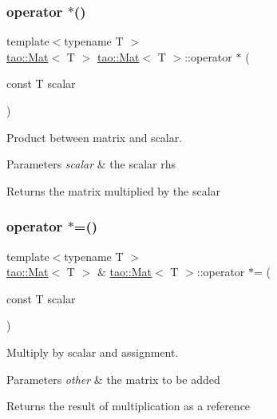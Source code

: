 \subsubsection{\texorpdfstring{operator $\ast$()}{operator *()}\hspace{0.1cm}{\footnotesize\ttfamily [2/2]}}
{\footnotesize\ttfamily template$<$typename T $>$ \\
\mbox{\hyperlink{classtao_1_1_mat}{tao\+::\+Mat}}$<$ T $>$ \mbox{\hyperlink{classtao_1_1_mat}{tao\+::\+Mat}}$<$ T $>$\+::operator $\ast$ (\begin{DoxyParamCaption}\item[{const T}]{scalar }\end{DoxyParamCaption})}



Product between matrix and scalar. 


\begin{DoxyParams}{Parameters}
{\em scalar} & the scalar rhs \\
\hline
\end{DoxyParams}
\begin{DoxyReturn}{Returns}
the matrix multiplied by the scalar 
\end{DoxyReturn}
\mbox{\label{classtao_1_1_mat_add01ca6b2275ad6d4fbde98056d73276}} 
\subsubsection{\texorpdfstring{operator $\ast$=()}{operator *=()}}
{\footnotesize\ttfamily template$<$typename T $>$ \\
\mbox{\hyperlink{classtao_1_1_mat}{tao\+::\+Mat}}$<$ T $>$ \& \mbox{\hyperlink{classtao_1_1_mat}{tao\+::\+Mat}}$<$ T $>$\+::operator $\ast$= (\begin{DoxyParamCaption}\item[{const T}]{scalar }\end{DoxyParamCaption})}



Multiply by scalar and assignment. 


\begin{DoxyParams}{Parameters}
{\em other} & the matrix to be added \\
\hline
\end{DoxyParams}
\begin{DoxyReturn}{Returns}
the result of multiplication as a reference 
\end{DoxyReturn}
\mbox{\label{classtao_1_1_mat_a814d02bbf96dab62938912f792aa7994}} 
